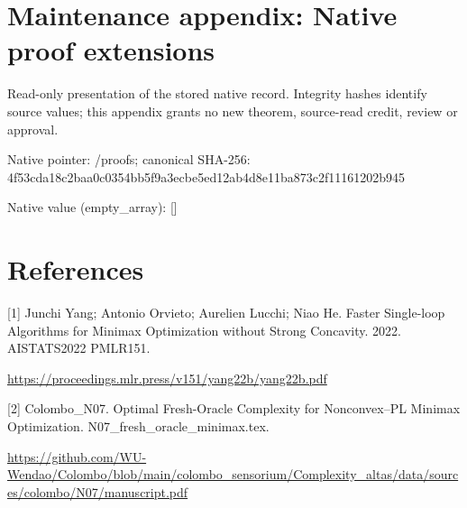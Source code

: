 \documentclass[10pt,a4paper]{article}
\begin{document}
\section{Maintenance appendix: Native proof extensions}


Read-only presentation of the stored native record. Integrity hashes identify source values; this appendix grants no new theorem, source-read credit, review or approval.



Native pointer: /proofs; canonical SHA-256: 4f53cda18c2baa0c0354bb5f\allowbreak{}9a3ecbe5ed12ab4d8e11ba87\allowbreak{}3c2f11161202b945



Native value (empty\_array): []



\section{References}


[1] Junchi Yang; Antonio Orvieto; Aurelien Lucchi; Niao He. Faster Single-loop Algorithms for Minimax Optimization without Strong Concavity. 2022. AISTATS2022 PMLR151.



\url{https://proceedings.mlr.press/v151/yang22b/yang22b.pdf}



[2] Colombo\_N07. Optimal Fresh-Oracle Complexity for Nonconvex--PL Minimax Optimization. N07\_fresh\_oracle\_minimax.tex.



\url{https://github.com/WU-Wendao/Colombo/blob/main/colombo_sensorium/Complexity_altas/data/sources/colombo/N07/manuscript.pdf}
\end{document}
